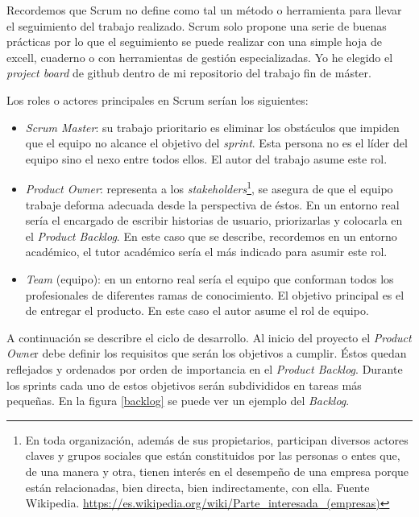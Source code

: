 Recordemos que Scrum no define como tal un método o herramienta para llevar el seguimiento del trabajo realizado. Scrum solo propone una serie de buenas prácticas por lo que el seguimiento se puede realizar con una simple hoja de excell, cuaderno o con herramientas de gestión especializadas. Yo he elegido el \textit{project board} de github dentro de mi repositorio del trabajo fin de máster.

Los roles o actores principales en Scrum serían los siguientes: 
\begin{itemize}	
	\item \textit{Scrum Master}: su trabajo prioritario es eliminar los obstáculos que impiden que el equipo no alcance el objetivo del \textit{sprint}. Esta persona no es el líder del equipo sino el nexo entre todos ellos. El autor del trabajo asume este rol.
	\item \textit{Product Owner}: representa a los \textit{stakeholders}\footnote{En toda organización, además de sus propietarios, participan diversos actores claves y grupos sociales que están constituidos por las personas o entes que, de una manera y otra, tienen interés en el desempeño de una empresa porque están relacionadas, bien directa, bien indirectamente, con ella. Fuente Wikipedia. \url{https://es.wikipedia.org/wiki/Parte_interesada_(empresas)}}, se asegura de que el equipo trabaje deforma adecuada desde la perspectiva de éstos. En un entorno real sería el encargado de escribir historias de usuario, priorizarlas y colocarla en el \textit{Product Backlog}. En este caso que se describe, recordemos en un entorno académico, el tutor académico sería el más indicado para asumir este rol. 
	\item \textit{Team} (equipo): en un entorno real sería el equipo que conforman todos los profesionales de diferentes ramas de conocimiento. El objetivo principal es el de entregar el producto. En este caso el autor asume el rol de equipo.
\end{itemize}

A continuación se describre el ciclo de desarrollo. Al inicio del proyecto el \textit{Product Owne}r debe definir los requisitos que serán los objetivos a cumplir. Éstos quedan reflejados y ordenados por orden de importancia en el \textit{Product Backlog}. Durante los sprints cada uno de estos objetivos serán subdivididos en tareas más pequeñas. En la figura \ref{backlog} se puede ver un ejemplo del \textit{Backlog}. 


